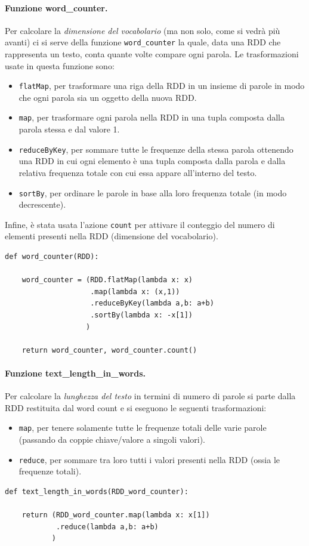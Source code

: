 \documentclass[titlepage]{article}
\begin{document}
\paragraph{Funzione word\_counter.}
Per calcolare la \textit{dimensione del vocabolario} (ma non solo, come si vedrà più avanti) ci si serve della funzione \texttt{word\_counter} la quale, data una RDD che rappresenta un testo, conta quante volte compare ogni parola. Le trasformazioni usate in questa funzione sono:
\begin{itemize}
    \item \texttt{flatMap}, per trasformare una riga della RDD in un insieme di parole in modo che ogni parola sia un oggetto della nuova RDD.
    \item \texttt{map}, per trasformare ogni parola nella RDD in una tupla composta dalla parola stessa e dal valore 1.
    \item \texttt{reduceByKey}, per sommare tutte le frequenze della stessa parola ottenendo una RDD in cui ogni elemento è una tupla composta dalla parola e dalla relativa frequenza totale con cui essa appare all'interno del testo.
    \item \texttt{sortBy}, per ordinare le parole in base alla loro frequenza totale (in modo decrescente).
\end{itemize}
Infine, è stata usata l'azione \texttt{count} per attivare il conteggio del numero di elementi presenti nella RDD (dimensione del vocabolario).
\begin{verbatim}
def word_counter(RDD):

    word_counter = (RDD.flatMap(lambda x: x)
                    .map(lambda x: (x,1))
                    .reduceByKey(lambda a,b: a+b)
                    .sortBy(lambda x: -x[1])
                   )
                   
    return word_counter, word_counter.count()
\end{verbatim}

\paragraph{Funzione text\_length\_in\_words.}
Per calcolare la \textit{lunghezza del testo} in termini di numero di parole si parte dalla RDD restituita dal word count e si eseguono le seguenti trasformazioni:
\begin{itemize}
    \item \texttt{map}, per tenere solamente tutte le frequenze totali delle varie parole (passando da coppie chiave/valore a singoli valori).
    \item \texttt{reduce}, per sommare tra loro tutti i valori presenti nella RDD (ossia le frequenze totali).
\end{itemize}
\begin{verbatim}
def text_length_in_words(RDD_word_counter):

    return (RDD_word_counter.map(lambda x: x[1])
            .reduce(lambda a,b: a+b)
           )
\end{verbatim}
\end{document}
